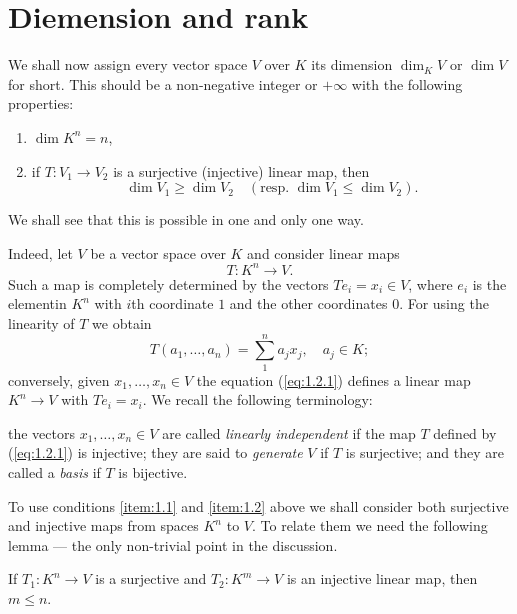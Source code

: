 \section{Diemension and rank}
We shall now assign every vector space $V$ over $K$ its dimension
$\dim_KV$ or $\dim V$ for short. This should be a non-negative integer
or $+\infty$ with the following properties:
\begin{enumerate}[label=\alph*)]
\item\label{item:1.1} $\dim K^n=n$,
\item\label{item:1.2} if $T:V_1\to V_2$ is a surjective (injective) linear map, then
  \begin{displaymath}
    \dim V_1\geq \dim V_2 \quad(\textrm{resp. }\dim V_1\leq\dim V_2).
  \end{displaymath}
\end{enumerate}
We shall see that this is possible in one and only one way.\par
Indeed, let $V$ be a vector space over $K$ and consider linear maps
\begin{displaymath}
  T: K^n\to V.
\end{displaymath}
Such a map is completely determined by the vectors $Te_i=x_i\in V$,
where $e_i$ is the element\linebreak in $K^n$ with $i$th coordinate $1$ and the
other coordinates $0$. For using the linearity of $T$ we obtain
\begin{equation}
  \label{eq:1.2.1}
  T(a_1,\dots,a_n)=\sum_1^na_jx_j,\quad a_j\in K;
\end{equation}%
conversely, given $x_1,\dots,x_n\in V$ the equation (\ref{eq:1.2.1})
defines a linear map $K^n\to V$ with $Te_i=x_i$. We recall the
following terminology:
\begin{dfn}
  the vectors $x_1,\dots,x_n\in V$ are called \emph{linearly
    independent} if the map $T$ defined by (\ref{eq:1.2.1}) is
  injective; they are said to \emph{generate} $V$ if $T$ is
  surjective; and they are called a \emph{basis} if $T$ is bijective.
\end{dfn}
To use conditions \ref{item:1.1} and \ref{item:1.2} above we shall
consider both surjective and injective maps from spaces $K^n$ to
$V$. To relate them we need the following lemma --- the only
non-trivial point in the discussion.
\begin{lem}\label{lem:1.2.2}
  If $T_1: K^n\to V$ is a surjective and $T_2: K^m\to V$ is an
  injective linear map, then $m\leq n$.
\end{lem}
